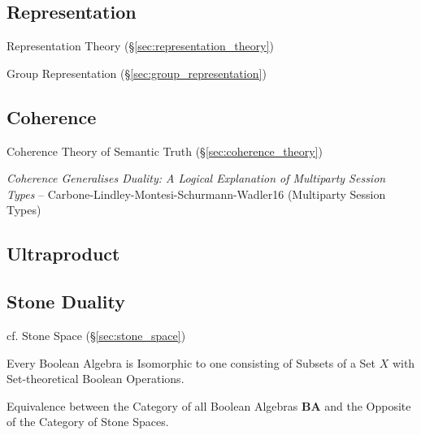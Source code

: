\subsection{Representation}\label{sec:model_representation}

Representation Theory (\S\ref{sec:representation_theory})

Group Representation (\S\ref{sec:group_representation})




\subsection{Coherence}\label{sec:coherence}

\fist Coherence Theory of Semantic Truth (\S\ref{sec:coherence_theory})

\emph{Coherence Generalises Duality: A Logical Explanation of
  Multiparty Session Types} --
Carbone-Lindley-Montesi-Schurmann-Wadler16 (Multiparty Session Types)



\subsection{Ultraproduct}\label{sec:ultraproducts}

\subsection{Stone Duality}\label{sec:stone_duality}

\fist cf. Stone Space (\S\ref{sec:stone_space})

Every Boolean Algebra is Isomorphic to one consisting of Subsets of a
Set $X$ with Set-theoretical Boolean Operations.

Equivalence between the Category of all Boolean Algebras $\mathbf{BA}$
and the Opposite of the Category of Stone Spaces.

